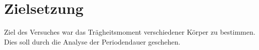 \section{Zielsetzung}
\label{sec:Zielsetzung}

Ziel des Versuches war das Trägheitsmoment verschiedener Körper zu bestimmen.
Dies soll durch die Analyse der Periodendauer geschehen.
